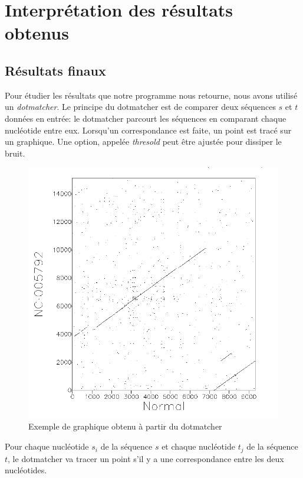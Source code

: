 
\section{Interprétation des résultats obtenus}

\subsection{Résultats finaux}

Pour étudier les résultats que notre programme nous retourne, nous avons utilisé
un \textit{dotmatcher}.
Le principe du dotmatcher est de comparer deux séquences $s$ et $t$ données en
entrée: le dotmatcher parcourt les séquences en comparant chaque nucléotide
entre eux.  Lorsqu'un correspondance est faite, un point est tracé sur un
graphique. Une option, appelée \textit{thresold} peut être ajustée pour dissiper
le bruit.

\begin{center}
	\begin{figure}[c]
		\includegraphics[scale= 0.4]{../res/cible1.png}
		Exemple de graphique obtenu à partir du dotmatcher
	\end{figure}
\end{center}

Pour chaque nucléotide $s_{i}$ de la séquence $s$ et chaque nucléotide $t_{j}$
de la séquence $t$, le dotmatcher va tracer un point s'il y a une correspondance
entre les deux nucléotides.

